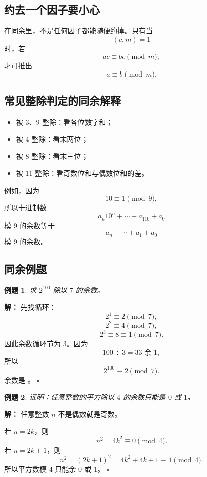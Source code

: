 \documentclass[11pt,a4paper,fontset=fandol]{ctexart}
\theoremstyle{formaltheorem}
\theoremstyle{formalexample}
\newtheorem{example}{例题}[section]
\newenvironment{solution}{\par\noindent\textbf{解：}}{\hfill$\square$\par}
\begin{document}
\subsection{约去一个因子要小心}

在同余里，不是任何因子都能随便约掉。只有当
\[
(c,m)=1
\]
时，若
\[
ac\equiv bc\pmod m,
\]
才可推出
\[
a\equiv b\pmod m.
\]

\subsection{常见整除判定的同余解释}

\begin{itemize}
  \item 被 $3$、$9$ 整除：看各位数字和；
  \item 被 $4$ 整除：看末两位；
  \item 被 $8$ 整除：看末三位；
  \item 被 $11$ 整除：看奇数位和与偶数位和的差。
\end{itemize}

例如，因为
\[
10\equiv 1\pmod 9,
\]
所以十进制数
\[
a_n10^n+\cdots +a_110+a_0
\]
模 $9$ 的余数等于
\[
a_n+\cdots +a_1+a_0
\]
模 $9$ 的余数。

\subsection{同余例题}

\begin{example}
求 $2^{100}$ 除以 $7$ 的余数。
\end{example}

\begin{solution}
先找循环：
\[
2^1\equiv 2\pmod 7,
\]
\[
2^2\equiv 4\pmod 7,
\]
\[
2^3\equiv 8\equiv 1\pmod 7.
\]
因此余数循环节为 $3$。因为
\[
100\div 3=33\text{ 余 }1,
\]
所以
\[
2^{100}\equiv 2\pmod 7.
\]
余数是 。
\end{solution}

\begin{example}
证明：任意整数的平方除以 $4$ 的余数只能是 $0$ 或 $1$。
\end{example}

\begin{solution}
任意整数 $n$ 不是偶数就是奇数。

若 $n=2k$，则
\[
n^2=4k^2\equiv 0\pmod 4.
\]
若 $n=2k+1$，则
\[
n^2=(2k+1)^2=4k^2+4k+1\equiv 1\pmod 4.
\]
所以平方数模 $4$ 只能余 $0$ 或 $1$。
\end{solution}
\end{document}
